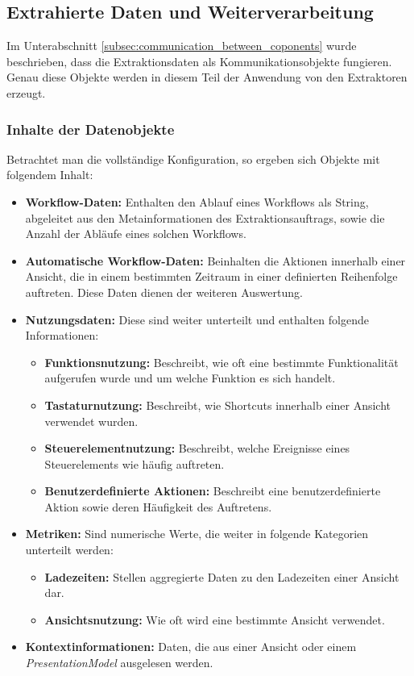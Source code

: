 \subsection{Extrahierte Daten und Weiterverarbeitung}
\label{subsec:extraction_data_and_converting}
Im Unterabschnitt \ref{subsec:communication_between_coponents} wurde beschrieben, dass die Extraktionsdaten als Kommunikationsobjekte fungieren. Genau diese Objekte werden in diesem Teil der Anwendung von den Extraktoren erzeugt. 

\subsubsection{Inhalte der Datenobjekte}
Betrachtet man die vollständige Konfiguration, so ergeben sich Objekte mit folgendem Inhalt:

\begin{itemize}
    \item \textbf{Workflow-Daten:} Enthalten den Ablauf eines Workflows als String, abgeleitet aus den Metainformationen des Extraktionsauftrags, sowie die Anzahl der Abläufe eines solchen Workflows.
    
    \item \textbf{Automatische Workflow-Daten:} Beinhalten die Aktionen innerhalb einer Ansicht, die in einem bestimmten Zeitraum in einer definierten Reihenfolge auftreten. Diese Daten dienen der weiteren Auswertung.
    
    \item \textbf{Nutzungsdaten:} Diese sind weiter unterteilt und enthalten folgende Informationen:
    \begin{itemize}
        \item \textbf{Funktionsnutzung:} Beschreibt, wie oft eine bestimmte Funktionalität aufgerufen wurde und um welche Funktion es sich handelt.
        \item \textbf{Tastaturnutzung:} Beschreibt, wie Shortcuts innerhalb einer Ansicht verwendet wurden.
        \item \textbf{Steuerelementnutzung:} Beschreibt, welche Ereignisse eines Steuerelements wie häufig auftreten.
        \item \textbf{Benutzerdefinierte Aktionen:} Beschreibt eine benutzerdefinierte Aktion sowie deren Häufigkeit des Auftretens.
    \end{itemize}
    
    \item \textbf{Metriken:} Sind numerische Werte, die weiter in folgende Kategorien unterteilt werden:
    \begin{itemize}
        \item \textbf{Ladezeiten:} Stellen aggregierte Daten zu den Ladezeiten einer Ansicht dar.
        \item \textbf{Ansichtsnutzung:} Wie oft wird eine bestimmte Ansicht verwendet.
    \end{itemize}
    
    \item \textbf{Kontextinformationen:} Daten, die aus einer Ansicht oder einem \textit{PresentationModel} ausgelesen werden.
\end{itemize}

